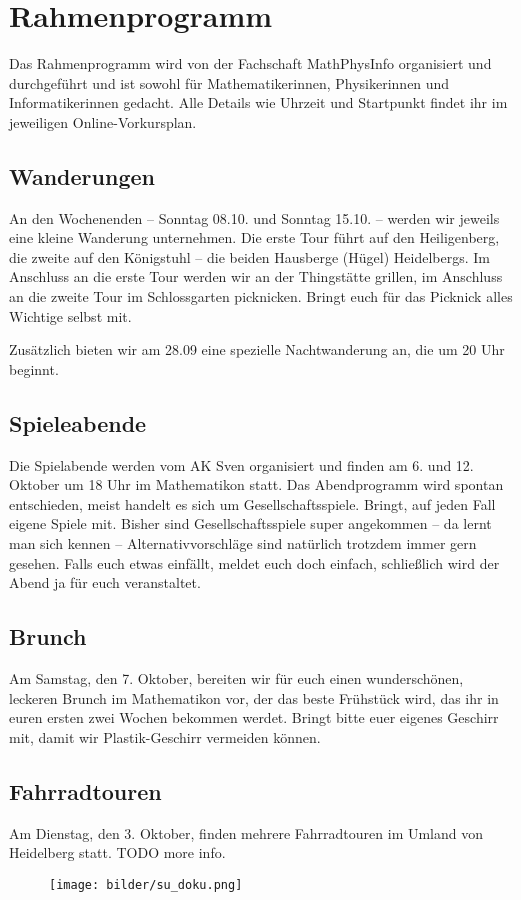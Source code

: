 \newpage
\section{Rahmenprogramm}

Das Rahmenprogramm wird von der Fachschaft MathPhysInfo organisiert und durchgeführt und ist sowohl für Mathematikerinnen, Physikerinnen und Informatikerinnen gedacht. Alle Details wie Uhrzeit und Startpunkt findet ihr im jeweiligen Online-Vorkursplan.

\subsection{Wanderungen}
An den Wochenenden -- Sonntag 08.10. und Sonntag 15.10. -- werden wir jeweils eine kleine Wanderung unternehmen. Die erste Tour führt auf den Heiligenberg, die zweite auf den Königstuhl -- die beiden Hausberge (Hügel) Heidelbergs. Im Anschluss an die erste Tour werden wir an der Thingstätte grillen, im Anschluss an die zweite Tour im Schlossgarten picknicken. Bringt euch für das Picknick alles Wichtige selbst mit.

Zusätzlich bieten wir am 28.09 eine spezielle Nachtwanderung an, die um 20 Uhr beginnt.


\subsection{Spieleabende}
Die Spielabende werden vom AK Sven organisiert und finden am 6. und 12. Oktober um 18 Uhr im \gls{Mathematikon} statt. Das Abendprogramm wird spontan entschieden, meist handelt es sich um Gesellschaftsspiele. Bringt, auf jeden Fall eigene Spiele mit. Bisher sind Gesellschaftsspiele super angekommen -- da lernt man sich kennen -- Alternativvorschläge sind natürlich trotzdem immer gern gesehen. Falls euch etwas einfällt, meldet euch doch einfach, schließlich wird der Abend ja für euch veranstaltet.

\vfill

\eject

\subsection{Brunch}
Am Samstag, den 7. Oktober, bereiten wir für euch einen wunderschönen, leckeren Brunch im \gls{Mathematikon} vor, der das beste Frühstück wird, das ihr in euren ersten zwei Wochen bekommen werdet. Bringt bitte euer eigenes Geschirr mit, damit wir Plastik-Geschirr vermeiden können.

\subsection{Fahrradtouren}
Am Dienstag, den 3. Oktober, finden mehrere Fahrradtouren im Umland von Heidelberg statt. TODO more info.


\vspace{4cm}

\begin{figure}[h]
\centering
\texttt{[image: bilder/su\_doku.png]}
\end{figure}
